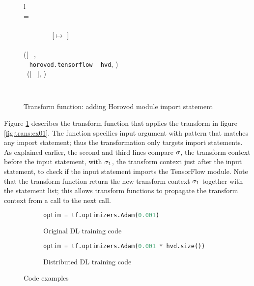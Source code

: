 \begin{figure}[ht!]
  \centering
  \noindent
  \begin{tabular}{l}
   \\
   \tstmt{\kimport ~ \mul{\nalias}}{\smodenv} = \\
    \inden \ktlet ~  ~ \kteq ~ \taalias{\mul{\nalias}}{\smodenv} \ktin \\
    \inden \ktif ~  ~ \envsub ~ \smodenv ~ \kteq ~ [\tflow $\mapsto$ \nid]\\ 
    \inden\ktthen \\
    \inden\hspace{1em} ([\kimport ~ \mul{\nalias}, \\
    \inden\hspace{1em} \kimport ~ {\tt horovod.tensorflow} \kas ~ {\tt hvd}, )\\
    \inden \ktelse~([\kimport ~ \mul{\nalias}], )
  \end{tabular}\\\vpar
  \caption{Transform function: adding Horovod module import statement}
  \label{fig:trans:fn01}
\end{figure}

Figure \ref{fig:trans:fn01} describes the transform function that applies the
transform in figure \ref{fig:trans:ex01}. 
The function specifies input argument with pattern that matches any import
statement; thus the transformation only targets import statements.
As explained earlier, the second and third lines
compare $\sigma$, the transform context
before the input statement, with $\sigma_{1}$, the transform context
just after the input statement, to check if the input statement
imports the TensorFlow module.
Note that the transform function return the new transform context
$\sigma_{1}$ together with the statement list; this allows
transform functions to propagate the transform context from a call
to the next call.

\begin{figure}[ht!]
  \centering
  \begin{subfigure}[t]{0.48\textwidth}
    \begin{lstlisting}[language=Python]
optim = tf.optimizers.Adam(0.001)\end{lstlisting}
    \caption{Original DL training code}
  \end{subfigure}
  \hspace{5mm}
  \begin{subfigure}[t]{0.48\textwidth}
    \begin{lstlisting}[language=Python]
optim = tf.optimizers.Adam(0.001 * hvd.size())\end{lstlisting}
    \caption{Distributed DL training code}
  \end{subfigure}
  \caption{Code examples}
  \label{fig:trans:ex02}
\end{figure}

